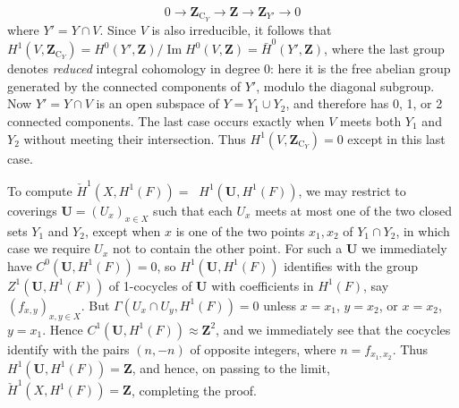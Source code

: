 \[
0\to\mathbf Z_{\mathrm C_Y}\to\mathbf Z
\to\mathbf Z_{Y'}\to 0
\]
where $Y'=Y\cap V$. Since $V$ is also irreducible, it follows that
$H^1(V,\mathbf Z_{\mathrm C_Y})
=H^0(Y',\mathbf Z)/\operatorname{Im}H^0(V,\mathbf Z)
=\bar H^0(Y',\mathbf Z)$,
where the last group denotes \emph{reduced} integral cohomology in degree 0: here it
is the free abelian group generated by the connected components of $Y'$,
modulo the diagonal subgroup.
Now $Y'=Y\cap V$ is an open subspace of $Y=Y_1\cup Y_2$, and therefore has
0, 1, or 2 connected components. The last case occurs exactly when $V$ meets
both $Y_1$ and $Y_2$ without meeting their intersection. Thus
$H^1(V,\mathbf Z_{\mathrm C_Y})=0$ except in this last case.

To compute
$\check H^1(X,H^1(F))=\mathop{\underset{\to}{\lim}} H^1(\mathbf U,H^1(F))$,
we may restrict to coverings $\mathbf U=(U_x)_{x\in X}$ such that each $U_x$
meets at most one of the two closed sets $Y_1$ and $Y_2$, except when $x$ is
one of the two points $x_1,x_2$ of $Y_1\cap Y_2$, in which case we require
$U_x$ not to contain the other point.
For such a $\mathbf U$ we immediately have $C^0(\mathbf U,H^1(F))=0$, so
$H^1(\mathbf U,H^1(F))$ identifies with the group
$Z^1(\mathbf U,H^1(F))$ of 1-cocycles of $\mathbf U$ with coefficients in
$H^1(F)$, say $(f_{x,y})_{x,y\in X}$.
But
$\Gamma(U_x\cap U_y,H^1(F))=0$
unless $x=x_1$, $y=x_2$, or $x=x_2$, $y=x_1$. Hence
$C^1(\mathbf U,H^1(F))\approx\mathbf Z^2$,
and we immediately see that the cocycles identify with the pairs $(n,-n)$ of opposite integers, where
$n=f_{x_1,x_2}$.
Thus $H^1(\mathbf U,H^1(F))=\mathbf Z$, and hence, on passing to the limit,
$\check H^1(X,H^1(F))=\mathbf Z$, completing the proof.

